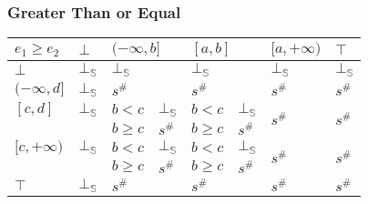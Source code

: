\documentclass{beamer}
\begin{document}
        \begin{frame}
            \frametitle{Greater Than or Equal}
        \begin{table}
            \begin{tabular}{|l|l|ll|ll|l|l|}
            \hline
            $e_1 \ge e_2$  & $\bot$ & \multicolumn{2}{l|}{$(-\infty, b]$} & \multicolumn{2}{l|}{$[a, b]$} & $[a, +\infty)$          & $\top$                  \\ \hline
            $\bot$         & $\bot_\mathbb{S}$ & \multicolumn{2}{l|}{$\bot_\mathbb{S}$}         & \multicolumn{2}{l|}{$\bot_\mathbb{S}$}   & $\bot_\mathbb{S}$                  & $\bot_\mathbb{S}$                  \\ \hline
            $(-\infty, d]$ & $\bot_\mathbb{S}$ & \multicolumn{2}{l|}{$s^\#$}         & \multicolumn{2}{l|}{$s^\#$}   & $s^\#$                  & $s^\#$                  \\ \hline
            $[c, d]$       & $\bot_\mathbb{S}$ & $b < c$            & $\bot_\mathbb{S}$         & $b < c$         & $\bot_\mathbb{S}$      & \multirow{2}{*}{$s^\#$} & \multirow{2}{*}{$s^\#$} \\
                            &        & $b \ge c$          & $s^\#$         & $b \ge c$       & $s^\#$      &                         &                         \\ \hline
            $[c, +\infty)$ & $\bot_\mathbb{S}$ & $b < c$            & $\bot_\mathbb{S}$         & $b < c$         & $\bot_\mathbb{S}$      & \multirow{2}{*}{$s^\#$} & \multirow{2}{*}{$s^\#$} \\
                            &        & $b \ge c$          & $s^\#$         & $b \ge c$       & $s^\#$      &                         &                         \\ \hline
            $\top$         & $\bot_\mathbb{S}$ & \multicolumn{2}{l|}{$s^\#$}         & \multicolumn{2}{l|}{$s^\#$}   & $s^\#$                  & $s^\#$                  \\ \hline
            \end{tabular}
            \end{table}
        \end{frame}
\end{document}
